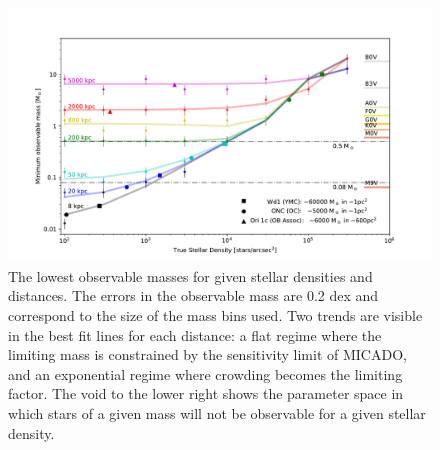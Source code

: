 \documentclass{aa}
\begin{document}
\begin{figure}

    \centering
    \includegraphics[width=\textwidth]{old_trusted_mass.pdf}

    \caption{The lowest observable masses for given stellar densities and distances.
    The errors in the observable mass are 0.2 dex and correspond to the size of the mass bins used.
    Two trends are visible in the best fit lines for each distance: a flat regime where the limiting mass is constrained by the sensitivity limit of MICADO, and an exponential regime where crowding becomes the limiting factor.
    The void to the lower right shows the parameter space in which stars of a given mass will not be observable for a given stellar density.
    }
    \label{fig:trusted_mass}
\end{figure}
\end{document}
